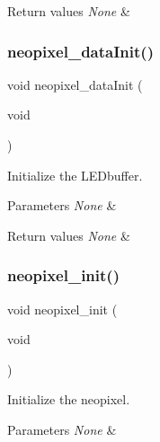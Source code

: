 \begin{DoxyRetVals}{Return values}
{\em None} & \\
\hline
\end{DoxyRetVals}
\mbox{\label{group__neopixel_ga79e34feddcfb2c45ae218166c84bdff4}} 
\subsubsection{\texorpdfstring{neopixel\+\_\+data\+Init()}{neopixel\_dataInit()}}
{\footnotesize\ttfamily void neopixel\+\_\+data\+Init (\begin{DoxyParamCaption}\item[{void}]{ }\end{DoxyParamCaption})}



Initialize the L\+E\+Dbuffer. 


\begin{DoxyParams}{Parameters}
{\em None} & \\
\hline
\end{DoxyParams}

\begin{DoxyRetVals}{Return values}
{\em None} & \\
\hline
\end{DoxyRetVals}
\mbox{\label{group__neopixel_gaac78468985e44a3e4d353ea9276b33bc}} 
\subsubsection{\texorpdfstring{neopixel\+\_\+init()}{neopixel\_init()}}
{\footnotesize\ttfamily void neopixel\+\_\+init (\begin{DoxyParamCaption}\item[{void}]{ }\end{DoxyParamCaption})}



Initialize the neopixel. 


\begin{DoxyParams}{Parameters}
{\em None} & \\
\hline
\end{DoxyParams}

